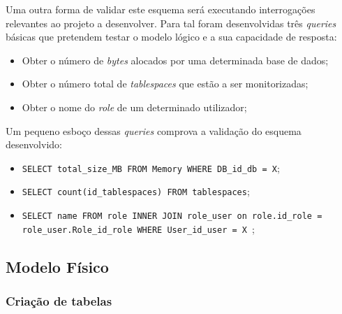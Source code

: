\documentclass[a4paper]{article}
\begin{document}
Uma outra forma de validar este esquema será executando interrogações relevantes ao projeto a desenvolver. Para tal foram desenvolvidas três \emph{queries} básicas que pretendem testar o modelo lógico e a sua capacidade de resposta:
\begin{itemize}
    \item Obter o número de \emph{bytes} alocados por uma determinada base de dados;
    \item Obter o número total de \emph{tablespaces} que estão a ser monitorizadas;
    \item Obter o nome do \emph{role} de um determinado utilizador;
\end{itemize}

\hspace{2mm} 

Um pequeno esboço dessas \emph{queries} comprova a validação do esquema desenvolvido:


\begin{itemize}
    \item \texttt{SELECT total\_size\_MB FROM Memory WHERE DB\_id\_db = X};
    \item \texttt{SELECT count(id\_tablespaces) FROM tablespaces};
    \item \texttt{SELECT name FROM role INNER JOIN role\_user on role.id\_role = role\_user.Role\_id\_role WHERE User\_id\_user = X };
\end{itemize}



\subsection{Modelo Físico}
\hspace{3mm} 

\subsubsection{Criação de tabelas}
\end{document}
